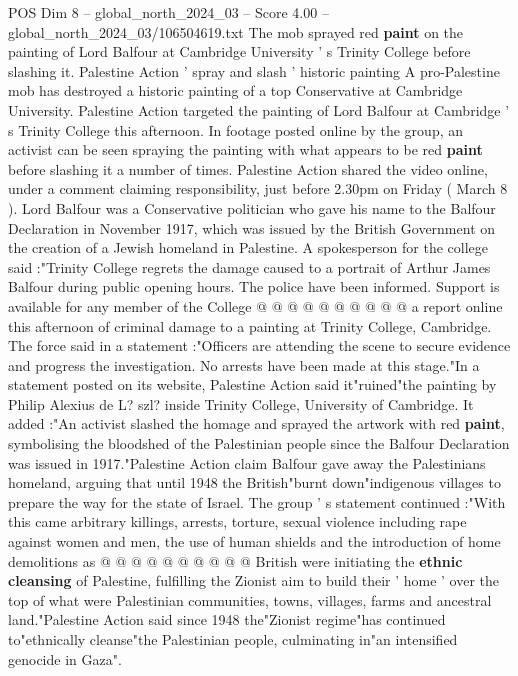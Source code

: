\begin{textsample}{POS Dim 8 – global\_north\_2024\_03 – Score 4.00 – global\_north\_2024\_03/106504619.txt}  \label{ex:f8_pos_226}
The mob sprayed red \textbf{paint} on the painting of Lord Balfour at Cambridge University ' s Trinity College before slashing it.
Palestine Action ' spray and slash ' historic painting A pro-Palestine mob has destroyed a historic painting of a top Conservative at Cambridge University.
Palestine Action targeted the painting of Lord Balfour at Cambridge ' s Trinity College this afternoon.
In footage posted online by the group, an activist can be seen spraying the painting with what appears to be red \textbf{paint} before slashing it a number of times.
Palestine Action shared the video online, under a comment claiming responsibility, just before 2.30pm on Friday ( March 8 ).
Lord Balfour was a Conservative politician who gave his name to the Balfour Declaration in November 1917, which was issued by the British Government on the creation of a Jewish homeland in Palestine.
A spokesperson for the college said :"Trinity College regrets the damage caused to a portrait of Arthur James Balfour during public opening hours.
The police have been informed.
Support is available for any member of the College @ @ @ @ @ @ @ @ @ @ a report online this afternoon of criminal damage to a painting at Trinity College, Cambridge.
The force said in a statement :"Officers are attending the scene to secure evidence and progress the investigation.
No arrests have been made at this stage."In a statement posted on its website, Palestine Action said it"ruined"the painting by Philip Alexius de L? szl? inside Trinity College, University of Cambridge.
It added :"An activist slashed the homage and sprayed the artwork with red \textbf{paint}, symbolising the bloodshed of the Palestinian people since the Balfour Declaration was issued in 1917."Palestine Action claim Balfour gave away the Palestinians homeland, arguing that until 1948 the British"burnt down"indigenous villages to prepare the way for the state of Israel.
The group ' s statement continued :"With this came arbitrary killings, arrests, torture, sexual violence including rape against women and men, the use of human shields and the introduction of home demolitions as @ @ @ @ @ @ @ @ @ @ British were initiating the \textbf{ethnic} \textbf{cleansing} of Palestine, fulfilling the Zionist aim to build their ' home ' over the top of what were Palestinian communities, towns, villages, farms and ancestral land."Palestine Action said since 1948 the"Zionist regime"has continued to"ethnically cleanse"the Palestinian people, culminating in"an intensified genocide in Gaza".

\end{textsample}
